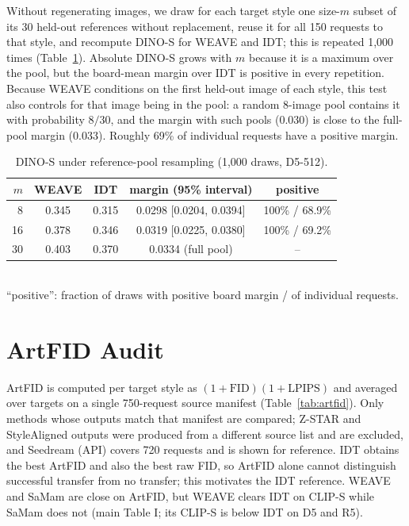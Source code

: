 \documentclass[conference]{IEEEtran}
\newcommand{\dinos}{DINO-S}
\newcommand{\clips}{CLIP-S}
\begin{document}
Without regenerating images, we draw for each target style one size-$m$ subset of its 30 held-out
references without replacement, reuse it for all 150 requests to that style, and recompute
\dinos{} for WEAVE and IDT; this is repeated 1{,}000 times (Table~\ref{tab:refpool}). Absolute
\dinos{} grows with $m$ because it is a maximum over the pool, but the board-mean margin over IDT is
positive in every repetition. Because WEAVE conditions on the first held-out image of each style,
this test also controls for that image being in the pool: a random 8-image pool contains it with
probability $8/30$, and the margin with such pools (0.030) is close to the full-pool margin (0.033).
Roughly 69\% of individual requests have a positive margin.

\begin{table}[t]
\centering
\caption{\dinos{} under reference-pool resampling (1{,}000 draws, D5-512).}
\label{tab:refpool}
\footnotesize
\setlength{\tabcolsep}{3pt}
\begin{tabular}{@{}rcccc@{}}
\toprule
$m$ & WEAVE & IDT & margin (95\% interval) & positive \\
\midrule
8 & 0.345 & 0.315 & 0.0298 [0.0204, 0.0394] & 100\% / 68.9\% \\
16 & 0.378 & 0.346 & 0.0319 [0.0225, 0.0380] & 100\% / 69.2\% \\
30 & 0.403 & 0.370 & 0.0334 (full pool) & -- \\
\bottomrule
\end{tabular}\\[2pt]
{\scriptsize ``positive'': fraction of draws with positive board margin / of individual requests.}
\end{table}

\section{ArtFID Audit}
\label{sec:artfid}

ArtFID is computed per target style as $(1+\mathrm{FID})(1+\mathrm{LPIPS})$ and averaged over
targets on a single 750-request source manifest (Table~\ref{tab:artfid}). Only methods whose
outputs match that manifest are compared; Z-STAR and StyleAligned outputs were produced from a
different source list and are excluded, and Seedream (API) covers 720 requests and is shown for
reference. IDT obtains the best ArtFID and also the best raw FID, so ArtFID alone cannot
distinguish successful transfer from no transfer; this motivates the IDT reference. WEAVE and
SaMam are close on ArtFID, but WEAVE clears IDT on \clips{} while SaMam does not (main Table I; its CLIP-S is below IDT on D5 and R5).
\end{document}
